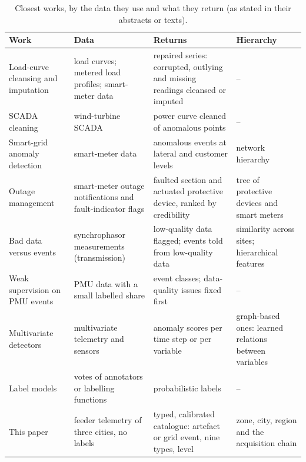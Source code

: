 \begin{table}[htbp]
\centering
\caption{Closest works, by the data they use and what they return (as stated in their abstracts or texts).}
\label{tab:positioning}
\footnotesize
\setlength{\tabcolsep}{4pt}
\begin{tabularx}{\textwidth}{@{}L{3.3cm} L{3.2cm} Y L{2.3cm}@{}}
\toprule
Work & Data & Returns & Hierarchy \\
\midrule
Load-curve cleansing and imputation \cite{chen2010cleansing,mateos2013cleansing,peppanen2016imputation} & load curves; metered load profiles; smart-meter data & repaired series: corrupted, outlying and missing readings cleansed or imputed & -- \\
SCADA cleaning \cite{morrison2022scada} & wind-turbine SCADA & power curve cleaned of anomalous points & -- \\
Smart-grid anomaly detection \cite{moghaddass2018hierarchical} & smart-meter data & anomalous events at lateral and customer levels & network hierarchy \\
Outage management \cite{jiang2016outage} & smart-meter outage notifications and fault-indicator flags & faulted section and actuated protective device, ranked by credibility & tree of protective devices and smart meters \\
Bad data versus events \cite{wu2017lowquality,wu2021iforest} & synchrophasor measurements (transmission) & low-quality data flagged; events told from low-quality data & similarity across sites; hierarchical features \\
Weak supervision on PMU events \cite{liu2022weakly,liu2025automatic} & PMU data with a small labelled share & event classes; data-quality issues fixed first \cite{liu2022weakly} & -- \\
Multivariate detectors \cite{hundman2018spacecraft,su2019omnianomaly,audibert2020usad,zhao2020mtadgat,deng2021gdn} & multivariate telemetry and sensors & anomaly scores per time step or per variable & graph-based ones: learned relations between variables \\
Label models \cite{dawid1979,ratner2016dataprogramming,ratner2019metal} & votes of annotators or labelling functions & probabilistic labels & -- \\
\midrule
This paper & feeder telemetry of three cities, no labels & typed, calibrated catalogue: artefact or grid event, nine types, level & zone, city, region and the acquisition chain \\
\bottomrule
\end{tabularx}
\end{table}
